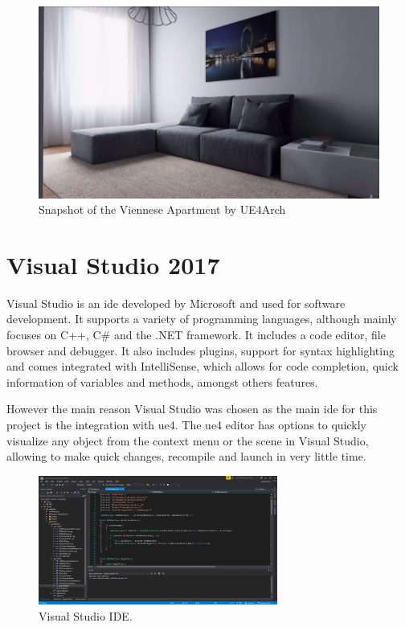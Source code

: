 \begin{figure}[h]
	\includegraphics[scale=0.2]{archivos/london_apartment.png}
	\centering
	\caption[Snapshot of the Viennese Apartment by UE4Arch]{Snapshot of the Viennese Apartment by UE4Arch\footnotemark}
	\label{fig:london_apartment}
\end{figure}

\section{Visual Studio 2017}
Visual Studio is an \gls{ide} developed by Microsoft and used for software development. It supports a variety of programming languages, although mainly focuses on C++, C\# and the .NET framework. It includes a code editor, file browser and debugger. It also includes plugins, support for syntax highlighting and comes integrated with IntelliSense, which allows for code completion, quick information of variables and methods, amongst others features.

However the main reason Visual Studio was chosen as the main \gls{ide} for this project is the integration with \gls{ue4}. The \gls{ue4} editor has options to quickly visualize any object from the context menu or the scene in Visual Studio, allowing to make quick changes, recompile and launch in very little time.

\begin{figure}[h]
	\includegraphics[width=0.7\textwidth]{archivos/vs_ide.png}
	\centering
	\caption{Visual Studio IDE.}
	\label{fig:visual_studio}
\end{figure}


